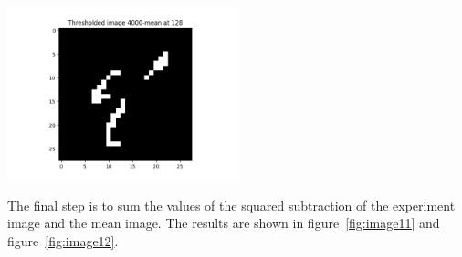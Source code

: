 \begin{center}
\includegraphics[width=0.5\textwidth]{image10.png}
\end{center}

The final step is to sum the values of the squared subtraction of the experiment image and the mean image. The results are shown in figure~\ref{fig:image11} and figure~\ref{fig:image12}.
